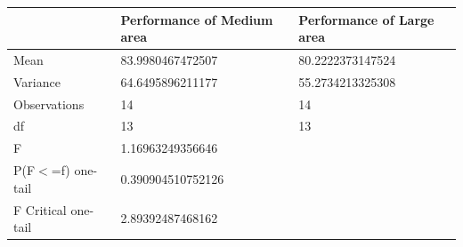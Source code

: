 \documentclass[uplatex,
12pt, %
a4paper,
english, %
oneside,
titlepage,
singlespacing, %
liststotoc, %
headsepline,
]{MastersDoctoralThesis} %
\begin{document}
\begin{appendices}
\begin{table}[H]
{\begin{tabular}{ p{3cm}|p{5cm}|p{5cm}}
		 &  Performance of Medium area &  Performance of Large area \\\hline
		Mean & 83.9980467472507 &80.2222373147524\\\hline
		Variance& 64.6495896211177 &55.2734213325308\\\hline
		Observations & 14 &14\\\hline
		df & 13 &13\\\hline
		F &1.16963249356646 & \\\hline
		P(F$<$=f) one-tail &0.390904510752126 & \\\hline
		F Critical one-tail &2.89392487468162 & \\\hline
		
	\end{tabular}
	}
\end{table}
\begin{table}[H]\centering
	\caption{t-Test: Two-Sample Assuming Equal Variances of performance of Medium area and performance of Large area  (Alpha = 0.033).}
	\label{tab:t-test of avoidance.}%
\end{table}
\end{appendices}
\end{document}
